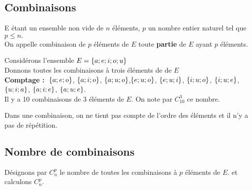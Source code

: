 \subsection{Combinaisons}
\begin{definition}
E étant un ensemble non vide de $ n $ éléments, $ p $ un nombre entier naturel tel que $ p\leq n. $\\
On appelle combinaison de $ p $ éléments de $ E $ toute \textbf{partie} de $ E $ ayant $ p $ éléments.
\end{definition}
\begin{example}
Considérons l'ensemble $ E=\left\{a; e; i; o; u\right\} $\\
Donnons toutes les combinaisons  à trois éléments de  de $ E $\\
\textbf{Comptage :} $ \;\left\{a; e; o\right\} $,  $ \left\{a; i; o\right\} $, $ \left\{a; u; o\right\} $,$ \left\{e; u; o\right\} $, $ \left\{e; u; i\right\} $, $ \left\{i; u; o\right\} $, $ \left\{i; u; e\right\} $, $ \left\{u; i; a\right\} $,  $ \left\{a; i; e\right\} $, $ \left\{a; u; e\right\} $.\\
Il y a 10 combinaisons de 3 éléments de $ E. $ On note par $ C_{10}^{3} $ ce nombre.
\end{example}
\begin{remark}
Dans une combinaison, on ne tient pas compte de l'ordre des éléments et il n'y a pas de répétition.
\end{remark}
\subsection*{Nombre de combinaisons}
Désignons par $ C_{n}^{p} $ le nombre de toutes les combinaisons à $ p $ éléments de $ E.$ et calculons $ C_{n}^{p} $. \\

